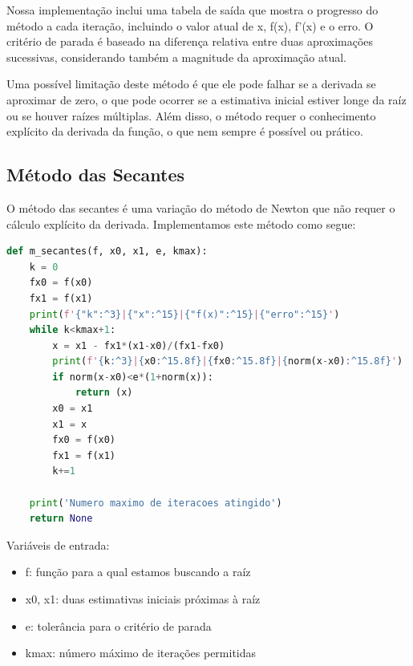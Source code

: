 \documentclass{article}
\begin{document}
Nossa implementa\c{c}\~{a}o inclui uma tabela de sa\'{i}da que mostra o progresso do m\'{e}todo a cada itera\c{c}\~{a}o, incluindo o valor atual de x, f(x), f'(x) e o erro. O crit\'{e}rio de parada \'{e} baseado na diferen\c{c}a relativa entre duas aproxima\c{c}\~{o}es sucessivas, considerando tamb\'{e}m a magnitude da aproxima\c{c}\~{a}o atual.

Uma poss\'{i}vel limita\c{c}\~{a}o deste m\'{e}todo \'{e} que ele pode falhar se a derivada se aproximar de zero, o que pode ocorrer se a estimativa inicial estiver longe da ra\'{i}z ou se houver ra\'{i}zes m\'{u}ltiplas. Al\'{e}m disso, o m\'{e}todo requer o conhecimento expl\'{i}cito da derivada da fun\c{c}\~{a}o, o que nem sempre \'{e} poss\'{i}vel ou pr\'{a}tico.


\subsection{M\'{e}todo das Secantes}
O m\'{e}todo das secantes \'{e} uma varia\c{c}\~{a}o do m\'{e}todo de Newton que n\~{a}o requer o c\'{a}lculo expl\'{i}cito da derivada. Implementamos este m\'{e}todo como segue:

\begin{lstlisting}[language=Python]
def m_secantes(f, x0, x1, e, kmax):
    k = 0
    fx0 = f(x0)
    fx1 = f(x1)
    print(f'{"k":^3}|{"x":^15}|{"f(x)":^15}|{"erro":^15}')
    while k<kmax+1:
        x = x1 - fx1*(x1-x0)/(fx1-fx0)
        print(f'{k:^3}|{x0:^15.8f}|{fx0:^15.8f}|{norm(x-x0):^15.8f}')  # Corpo da tabela
        if norm(x-x0)<e*(1+norm(x)):
            return (x)
        x0 = x1
        x1 = x
        fx0 = f(x0)
        fx1 = f(x1)
        k+=1
        
    print('Numero maximo de iteracoes atingido')
    return None
\end{lstlisting}

Vari\'{a}veis de entrada:
\begin{itemize}
    \item f: fun\c{c}\~{a}o para a qual estamos buscando a ra\'{i}z
    \item x0, x1: duas estimativas iniciais pr\'{o}ximas \`{a} ra\'{i}z
    \item e: toler\^{a}ncia para o crit\'{e}rio de parada
    \item kmax: n\'{u}mero m\'{a}ximo de itera\c{c}\~{o}es permitidas
\end{itemize}
\end{document}
